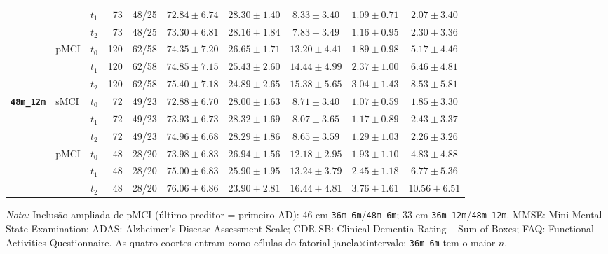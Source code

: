\documentclass[review]{elsarticle}
\newcommand{\code}[1]{\texttt{#1}}
\begin{document}
\begin{table}[htbp]
{\begin{tabular}{lllrrccccc}
		& & $t_1$ & 73 & 48/25 & $72.84\pm6.74$ & $28.30\pm1.40$ & $8.33\pm3.40$ & $1.09\pm0.71$ & $2.07\pm3.40$ \\
		& & $t_2$ & 73 & 48/25 & $73.30\pm6.81$ & $28.16\pm1.84$ & $7.83\pm3.49$ & $1.16\pm0.95$ & $2.30\pm3.36$ \\
		\cmidrule{2-10}
		& \multirow{3}{*}{pMCI}
		& $t_0$ & 120 & 62/58 & $74.35\pm7.20$ & $26.65\pm1.71$ & $13.20\pm4.41$ & $1.89\pm0.98$ & $5.17\pm4.46$ \\
		& & $t_1$ & 120 & 62/58 & $74.85\pm7.15$ & $25.43\pm2.60$ & $14.44\pm4.99$ & $2.37\pm1.00$ & $6.46\pm4.81$ \\
		& & $t_2$ & 120 & 62/58 & $75.40\pm7.18$ & $24.89\pm2.65$ & $15.38\pm5.65$ & $3.04\pm1.43$ & $8.53\pm5.81$ \\
		\midrule
		\multirow{6}{*}{\textbf{\code{48m\_12m}}}
		& \multirow{3}{*}{sMCI}
		& $t_0$ & 72 & 49/23 & $72.88\pm6.70$ & $28.00\pm1.63$ & $8.71\pm3.40$ & $1.07\pm0.59$ & $1.85\pm3.30$ \\
		& & $t_1$ & 72 & 49/23 & $73.93\pm6.73$ & $28.32\pm1.69$ & $8.07\pm3.65$ & $1.17\pm0.89$ & $2.43\pm3.37$ \\
		& & $t_2$ & 72 & 49/23 & $74.96\pm6.68$ & $28.29\pm1.86$ & $8.65\pm3.59$ & $1.29\pm1.03$ & $2.26\pm3.26$ \\
		\cmidrule{2-10}
		& \multirow{3}{*}{pMCI}
		& $t_0$ & 48 & 28/20 & $73.98\pm6.83$ & $26.94\pm1.56$ & $12.18\pm2.95$ & $1.93\pm1.10$ & $4.83\pm4.88$ \\
		& & $t_1$ & 48 & 28/20 & $75.00\pm6.83$ & $25.90\pm1.95$ & $13.24\pm3.79$ & $2.45\pm1.18$ & $6.77\pm5.36$ \\
		& & $t_2$ & 48 & 28/20 & $76.06\pm6.86$ & $23.90\pm2.81$ & $16.44\pm4.81$ & $3.76\pm1.61$ & $10.56\pm6.51$ \\
		\bottomrule
		\end{tabular}%
		}
		\begin{flushleft}
		\footnotesize
		\textit{Nota:} Inclusão ampliada de pMCI (último preditor = primeiro AD): 46 em \code{36m\_6m}/\code{48m\_6m}; 33 em \code{36m\_12m}/\code{48m\_12m}.
		MMSE: Mini-Mental State Examination; ADAS: Alzheimer's Disease Assessment Scale; CDR-SB: Clinical Dementia Rating -- Sum of Boxes; FAQ: Functional Activities Questionnaire.
		As quatro coortes entram como células do fatorial janela$\times$intervalo; \code{36m\_6m} tem o maior $n$.
		\end{flushleft}
		\end{table}
		
\end{document}
